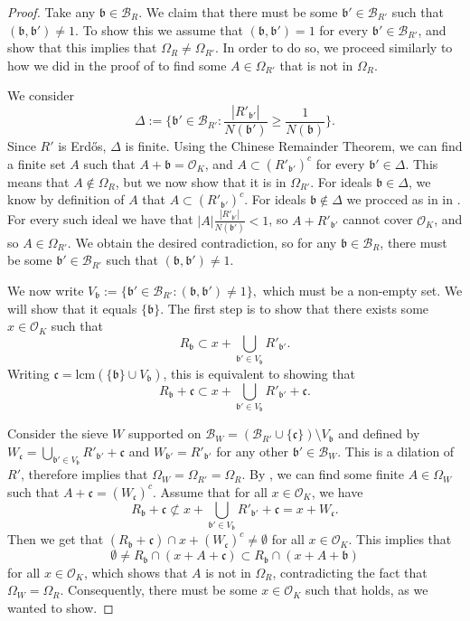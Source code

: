 \documentclass[10pt,a4paper]{amsart}
\newcommand{\cb}{\mathcal{B}}
\newcommand{\cbr}{\mathcal{B}_R}
\newcommand{\co}{\mathcal{O}}
\newcommand{\gb}{\mathfrak{b}}
\newcommand{\gc}{\mathfrak{c}}
\begin{document}
			\begin{proof}
				Take any $\gb \in \cb_R$. We claim that there must be some $\gb' \in \cb_{R'}$ such that $(\gb,\gb') \neq 1$. To show this we assume that  $(\gb,\gb') = 1$ for every $\gb' \in \cb_{R'}$, and show that this implies that $\Omega_{R} \neq \Omega_{R'}$. In order to do so, we proceed similarly to how we did in the proof of   to find some $A \in \Omega_{R'}$ that is not in $\Omega_R$.
				
				We consider $$\Delta := \{\gb'\in \cb_{R'}: \frac{|R'_{\gb'}|}{N(\gb')} \geq \frac{1}{N(\gb)}\}.$$ Since $R'$ is Erdős, $\Delta$ is finite. Using the Chinese Remainder Theorem, we can find a finite set $A$ such that $A+ \gb = \co_K$, and $A \subset (R'_{\gb'})^c$ for every $\gb' \in \Delta$. This means that $A \not \in \Omega_R$, but we now show that it is in $\Omega_{R'}$. For ideals $\gb\in \Delta$, we  know by definition of $A$ that $A \subset (R'_{\gb'})^c$. For ideals $\gb \not \in \Delta$ we procced as in in  . For every such ideal we have that $|A|\frac{|R'_{\gb'}|}{N(\gb')}  < 1$, so $A+ R'_{\gb'}$ cannot cover $\co_K$, and so  $A \in \Omega_{R'}$. We obtain the desired contradiction, so for any $\gb \in \cbr$, there must be some $\gb' \in \cb_{R'}$ such that $(\gb,\gb') \neq 1$.
				
				We now write $V_{\gb} := \{\gb' \in \cb_{R'}: (\gb, \gb') \neq 1 \},$ which must be a non-empty set. We will show that it equals $\{\gb\}$. The first step is to show that there exists some $x \in \co_K$ such that \begin{equation}
					\label{eq: Rgb subset of union}
					R_\gb \subset x+ \bigcup_{\gb' \in V_\gb} R'_{\gb'}.
				\end{equation}
				Writing $\gc = \text{lcm}(\{\gb\}\cup V_\gb)$, this is equivalent to showing that $$R_\gb + \gc \subset x+ \bigcup_{\gb' \in V_\gb} R'_{\gb'} + \gc.$$
				
				Consider the sieve $W$ supported on $\cb_W = (\cb_{R'}\cup\{\gc\})\setminus V_\gb$ and defined by $W_\gc = \bigcup_{\gb' \in V_\gb} R'_{\gb'} + \gc$ and $W_{\gb'} = R'_{\gb'}$ for any other $\gb' \in \cb_W$. This is a dilation of $R'$, therefore  implies that $\Omega_W = \Omega_{R'} = \Omega_{R}$. By , we can find some finite $A \in \Omega_W$ such that $A+\gc = (W_\gc)^c$. Assume that for all $x\in \co_K$, we have $$R_\gb +\gc \not \subset x+ \bigcup_{\gb' \in V_\gb} R'_{\gb'} + \gc =  x + W_\gc.$$ Then we get that $(R_\gb + \gc) \cap x + (W_\gc)^c \neq \emptyset$ for all $x\in \co_K$. This implies that $$\emptyset \neq R_\gb \cap (x+A+\gc) \subset R_\gb \cap (x+A+\gb) $$ for all $x\in \co_K$, which shows that $A$ is not in $\Omega_{R}$, contradicting the fact that $\Omega_W = \Omega_{R}$. Consequently, there must be some $x\in\co_K$ such that  holds, as we wanted to show.
				

\end{proof}
\end{document}
